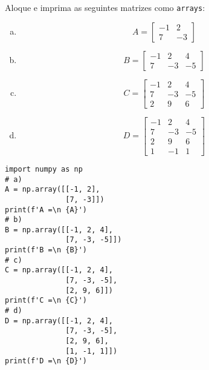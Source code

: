 \begin{exer}
  Aloque e imprima as seguintes matrizes como \lstinline+arrays+:
  \begin{enumerate}[a)]
  \item
    \begin{equation}
      A =
      \begin{bmatrix}
        -1 & 2\\
        7 & -3
      \end{bmatrix}
    \end{equation}
  \item
    \begin{equation}
      B =
      \begin{bmatrix}
        -1 & 2 & 4\\
        7 & -3 & -5 
      \end{bmatrix}
    \end{equation}
  \item
    \begin{equation}
      C =
      \begin{bmatrix}
        -1 & 2 & 4\\
        7 & -3 & -5\\
        2 & 9 & 6
      \end{bmatrix}
    \end{equation}
  \item
    \begin{equation}
      D =
      \begin{bmatrix}
        -1 & 2 & 4\\
        7 & -3 & -5\\
        2 & 9 & 6\\
        1 & -1 & 1
      \end{bmatrix}
    \end{equation}
  \end{enumerate}
\end{exer}
\begin{resp}
\begin{lstlisting}
import numpy as np
# a)
A = np.array([[-1, 2],
              [7, -3]])
print(f'A =\n {A}')
# b)
B = np.array([[-1, 2, 4],
              [7, -3, -5]])
print(f'B =\n {B}')
# c)
C = np.array([[-1, 2, 4],
              [7, -3, -5],
              [2, 9, 6]])
print(f'C =\n {C}')
# d)
D = np.array([[-1, 2, 4],
              [7, -3, -5],
              [2, 9, 6],
              [1, -1, 1]])
print(f'D =\n {D}')
\end{lstlisting}
\end{resp}

